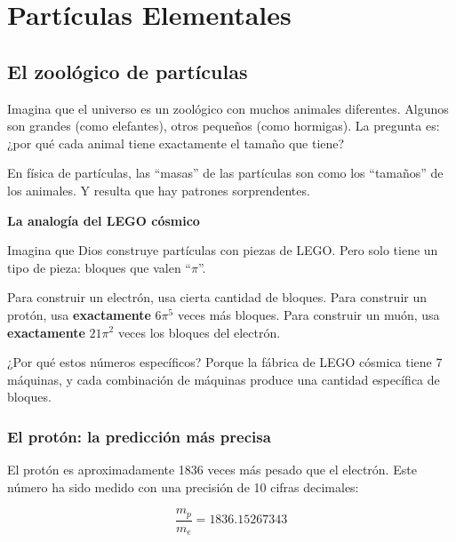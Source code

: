 \documentclass[12pt,a4paper,openany]{book}
\begin{document}
\chapter{Partículas Elementales}

\begin{nivelnarrativo}

\section*{El zoológico de partículas}

Imagina que el universo es un zoológico con muchos animales diferentes. Algunos son grandes (como elefantes), otros pequeños (como hormigas). La pregunta es: ¿por qué cada animal tiene exactamente el tamaño que tiene?

En física de partículas, las ``masas'' de las partículas son como los ``tamaños'' de los animales. Y resulta que hay patrones sorprendentes.

\begin{analogiabox}
\textbf{La analogía del LEGO cósmico}

Imagina que Dios construye partículas con piezas de LEGO. Pero solo tiene un tipo de pieza: bloques que valen ``$\pi$''.

Para construir un electrón, usa cierta cantidad de bloques.
Para construir un protón, usa \textbf{exactamente} $6\pi^5$ veces más bloques.
Para construir un muón, usa \textbf{exactamente} $21\pi^2$ veces los bloques del electrón.

¿Por qué estos números específicos? Porque la fábrica de LEGO cósmica tiene 7 máquinas, y cada combinación de máquinas produce una cantidad específica de bloques.
\end{analogiabox}

\subsection*{El protón: la predicción más precisa}

El protón es aproximadamente 1836 veces más pesado que el electrón. Este número ha sido medido con una precisión de 10 cifras decimales:

\begin{equation}
    \frac{m_p}{m_e} = 1836.15267343
\end{equation}


\end{nivelnarrativo}
\end{document}
